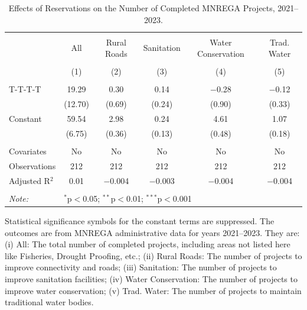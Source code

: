 \begin{table}[!htbp]
\centering
\begin{threeparttable}

  \caption{Effects of Reservations on the Number of Completed MNREGA Projects, 2021--2023.} 
  \label{main_mnrega_2011_2023} 
\scriptsize 
\begin{tabular}{@{\extracolsep{0pt}}lccccc} 
\\[-1.8ex]\hline 
\hline \\[-1.8ex] 
 & All & Rural Roads & Sanitation & Water Conservation & Trad. Water \\ 
\\[-1.8ex] & (1) & (2) & (3) & (4) & (5)\\ 
\hline \\[-1.8ex] 
 T-T-T-T & 19.29 & 0.30 & 0.14 & $-$0.28 & $-$0.12 \\ 
  & (12.70) & (0.69) & (0.24) & (0.90) & (0.33) \\ 
  Constant & 59.54 & 2.98 & 0.24 & 4.61 & 1.07 \\ 
  & (6.75) & (0.36) & (0.13) & (0.48) & (0.18) \\ 
 \hline \\[-1.8ex] 
Covariates & No & No & No & No & No \\ 
Observations & 212 & 212 & 212 & 212 & 212 \\ 
Adjusted R$^{2}$ & 0.01 & $-$0.004 & $-$0.003 & $-$0.004 & $-$0.004 \\ 
\hline 
\hline \\[-1.8ex] 
\textit{Note:}  & \multicolumn{5}{l}{$^{*}$p$<$0.05; $^{**}$p$<$0.01; $^{***}$p$<$0.001} \\ 
\end{tabular} 
\begin{tablenotes}[flushleft]
\scriptsize
\item[] Statistical significance symbols for the constant terms are suppressed. The outcomes are from MNREGA administrative data for years 2021--2023. They are: 
(i) All: The total number of completed projects, including areas not listed here like Fisheries, Drought Proofing, etc.;
(ii) Rural Roads: The number of projects to improve connectivity and roads;
(iii) Sanitation: The number of projects to improve sanitation facilities;
(iv) Water Conservation: The number of projects to improve water conservation;
(v) Trad. Water: The number of projects to maintain traditional water bodies.
\end{tablenotes}
\end{threeparttable}
\end{table}
